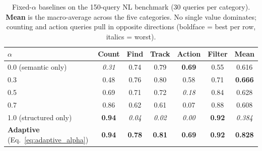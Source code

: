 ﻿\documentclass[conference]{IEEEtran}
\theoremstyle{definition}
\begin{document}
\begin{table}[!t]
\caption{Fixed-$\alpha$ baselines on the 150-query NL benchmark (30 queries per category). \textbf{Mean} is the macro-average across the five categories. No single value dominates; counting and action queries pull in opposite directions (boldface = best per row, italics = worst).}
\label{tab:alpha_baseline}
\centering
\footnotesize
\begin{tabular}{@{}lcccccc@{}}
\toprule
$\alpha$ & Count & Find & Track & Action & Filter & Mean \\
\midrule
0.0 (semantic only)  & \emph{0.31} & 0.74 & 0.79 & \textbf{0.69} & 0.55 & 0.616 \\
0.3                  & 0.48        & 0.76 & 0.80 & 0.58           & 0.71 & \textbf{0.666} \\
0.5                  & 0.69        & 0.71 & 0.72 & \emph{0.18}    & 0.84 & 0.628 \\
0.7                  & 0.86        & 0.62 & 0.61 & 0.07           & 0.88 & 0.608 \\
1.0 (structured only)& \textbf{0.94}& \emph{0.04}& \emph{0.02}& \emph{0.00} & \textbf{0.92} & \emph{0.384} \\
\midrule
\textbf{Adaptive} (Eq.~\eqref{eq:adaptive_alpha}) & \textbf{0.94} & \textbf{0.78} & \textbf{0.81} & \textbf{0.69} & \textbf{0.92} & \textbf{0.828} \\
\bottomrule
\end{tabular}
\end{table}
\end{document}
